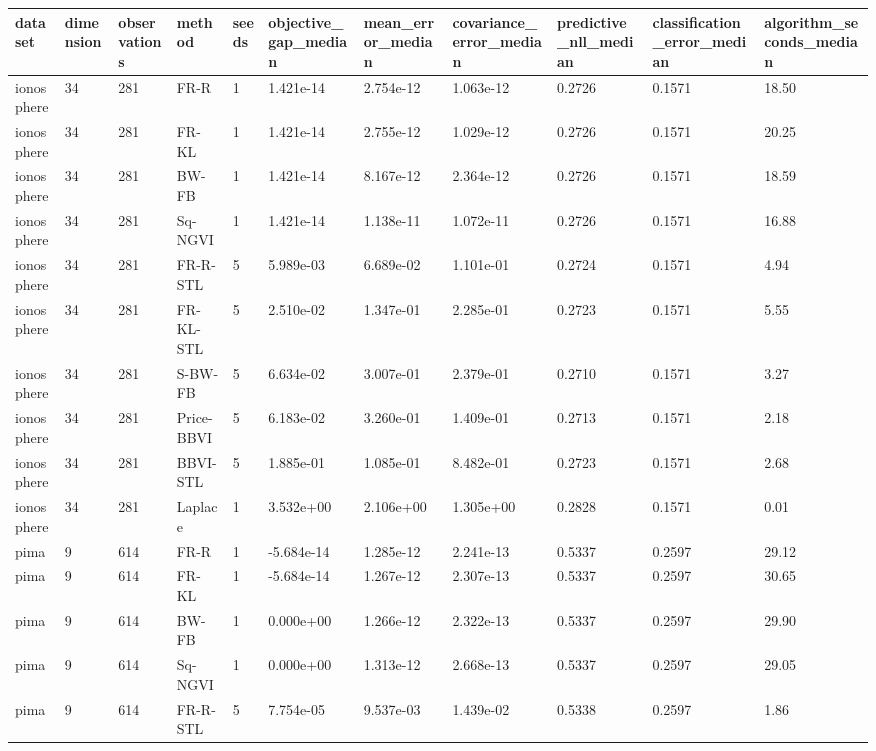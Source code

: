 \begin{tabular}{lllllllllll}
\toprule
dataset & dimension & observations & method & seeds & objective\_gap\_median & mean\_error\_median & covariance\_error\_median & predictive\_nll\_median & classification\_error\_median & algorithm\_seconds\_median \\
\midrule
ionosphere & 34 & 281 & FR-R & 1 & 1.421e-14 & 2.754e-12 & 1.063e-12 & 0.2726 & 0.1571 & 18.50 \\
ionosphere & 34 & 281 & FR-KL & 1 & 1.421e-14 & 2.755e-12 & 1.029e-12 & 0.2726 & 0.1571 & 20.25 \\
ionosphere & 34 & 281 & BW-FB & 1 & 1.421e-14 & 8.167e-12 & 2.364e-12 & 0.2726 & 0.1571 & 18.59 \\
ionosphere & 34 & 281 & Sq-NGVI & 1 & 1.421e-14 & 1.138e-11 & 1.072e-11 & 0.2726 & 0.1571 & 16.88 \\
ionosphere & 34 & 281 & FR-R-STL & 5 & 5.989e-03 & 6.689e-02 & 1.101e-01 & 0.2724 & 0.1571 & 4.94 \\
ionosphere & 34 & 281 & FR-KL-STL & 5 & 2.510e-02 & 1.347e-01 & 2.285e-01 & 0.2723 & 0.1571 & 5.55 \\
ionosphere & 34 & 281 & S-BW-FB & 5 & 6.634e-02 & 3.007e-01 & 2.379e-01 & 0.2710 & 0.1571 & 3.27 \\
ionosphere & 34 & 281 & Price-BBVI & 5 & 6.183e-02 & 3.260e-01 & 1.409e-01 & 0.2713 & 0.1571 & 2.18 \\
ionosphere & 34 & 281 & BBVI-STL & 5 & 1.885e-01 & 1.085e-01 & 8.482e-01 & 0.2723 & 0.1571 & 2.68 \\
ionosphere & 34 & 281 & Laplace & 1 & 3.532e+00 & 2.106e+00 & 1.305e+00 & 0.2828 & 0.1571 & 0.01 \\
pima & 9 & 614 & FR-R & 1 & -5.684e-14 & 1.285e-12 & 2.241e-13 & 0.5337 & 0.2597 & 29.12 \\
pima & 9 & 614 & FR-KL & 1 & -5.684e-14 & 1.267e-12 & 2.307e-13 & 0.5337 & 0.2597 & 30.65 \\
pima & 9 & 614 & BW-FB & 1 & 0.000e+00 & 1.266e-12 & 2.322e-13 & 0.5337 & 0.2597 & 29.90 \\
pima & 9 & 614 & Sq-NGVI & 1 & 0.000e+00 & 1.313e-12 & 2.668e-13 & 0.5337 & 0.2597 & 29.05 \\
pima & 9 & 614 & FR-R-STL & 5 & 7.754e-05 & 9.537e-03 & 1.439e-02 & 0.5338 & 0.2597 & 1.86 \\

\end{tabular}
